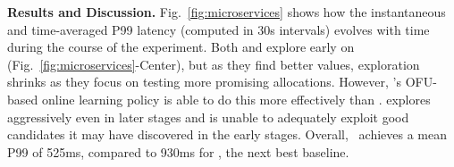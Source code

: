 
\textbf{Results and Discussion.} 
Fig.~\ref{fig:microservices}
shows how the instantaneous and time-averaged P99 latency (computed in 30s intervals) evolves
with time during the course of the experiment.
% 
Both \cilantros and \evoalgmss explore early on (Fig.~\ref{fig:microservices}-Center),
but as they find better values,
exploration shrinks as they focus on testing more promising allocations.
However, \cilantro's OFU-based online learning policy
is able to do this more effectively than \evoalgms.
\epsilongreedymss explores aggressively even in later stages and is unable to adequately exploit good
candidates it may have discovered in the early stages. 
Overall, \cilantro~achieves a mean P99 of 525ms, 
compared to 930ms for \evoalgms, the next best baseline.

% 

